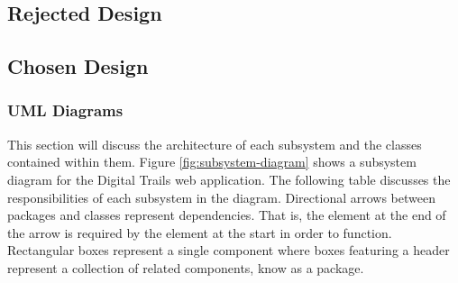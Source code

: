 \documentclass[11pt,a4paper]{report}
\begin{document}
\subsection{Rejected Design}
\label{sec:portal-rejected-design}

\subsection{Chosen Design}
\label{sec:portal-chosen-design}

\subsubsection{UML Diagrams}

This section will discuss the architecture of each subsystem and the classes contained within them. Figure \ref{fig:subsystem-diagram} shows a subsystem diagram for the Digital Trails web application. The following table discusses the responsibilities of each subsystem in the diagram. Directional arrows between packages and classes represent dependencies. That is, the element at the end of the arrow is required by the element at the start in order to function. Rectangular boxes represent a single component where boxes featuring a header represent a collection of related components, know as a package.
\end{document}

